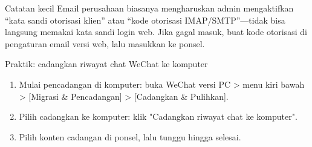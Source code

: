 \begin{tcbinfo}{Catatan kecil}
Email perusahaan biasanya mengharuskan admin mengaktifkan “kata sandi otorisasi klien” atau “kode otorisasi IMAP/SMTP”—tidak bisa langsung memakai kata sandi login web. Jika gagal masuk, buat kode otorisasi di pengaturan email versi web, lalu masukkan ke ponsel.

\end{tcbinfo}

\begin{tcbpractice}{Praktik: cadangkan riwayat chat WeChat ke komputer}
\begin{enumerate}
  \item Mulai pencadangan di komputer: buka WeChat versi PC > menu kiri bawah > [Migrasi \& Pencadangan] > [Cadangkan \& Pulihkan].
  \item Pilih cadangkan ke komputer: klik "Cadangkan riwayat chat ke komputer".
  \item Pilih konten cadangan di ponsel, lalu tunggu hingga selesai.
\end{enumerate}

\end{tcbpractice}
